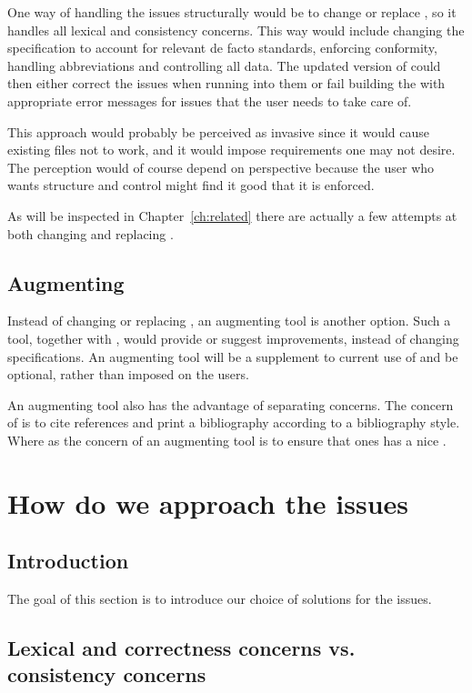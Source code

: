 One way of handling the issues structurally would be to change or
replace {\bibtex}, so it handles all lexical and consistency concerns.
This way would include changing the {\bibtex} specification to account
for relevant de facto standards, enforcing conformity, handling
abbreviations and controlling all data.  The updated version of
{\bibtex} could then either correct the issues when running into them
or fail building the  with appropriate error messages for
issues that the user needs to take care of.

This approach would probably be perceived as invasive since it would
cause existing {\bibtex} files not to work, and it would impose
requirements one may not desire.  The perception would of course
depend on perspective because the user who wants structure and control
might find it good that it is enforced.

As will be inspected in Chapter~\ref{ch:related} there are actually a
few attempts at both changing and replacing {\bibtex}.


\subsection{Augmenting {\bibtex}}

Instead of changing or replacing {\bibtex}, an augmenting tool is
another option.  Such a tool, together with {\bibtex}, would provide
or suggest improvements, instead of changing specifications.  An
augmenting tool will be a supplement to current use of {\bibtex} and
be optional, rather than imposed on the users.

An augmenting tool also has the advantage of separating concerns.  The
concern of {\bibtex} is to cite references and print a bibliography
according to a bibliography style.  Where as the concern of an
augmenting tool is to ensure that ones has a nice .

\section{How do we approach the {\bibtex} issues}
\subsection{Introduction}

The goal of this section is to introduce our choice of solutions for
the issues.


\subsection{Lexical and correctness concerns vs. consistency concerns}
\label{sec:approach_lexical_consistency}

